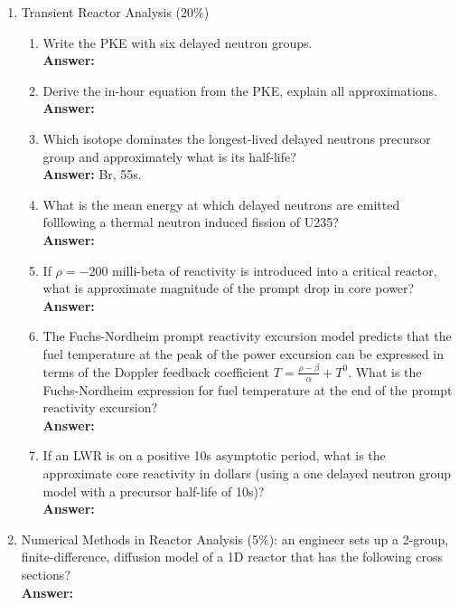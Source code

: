 \documentclass{school-22.211-notes}
\begin{document}
\begin{enumerate}
\item Transient Reactor Analysis (20\%) 
  \begin{enumerate}
  \item Write the PKE with six delayed neutron groups. \\
    \textbf{Answer:} 

  \item Derive the in-hour equation from the PKE, explain all approximations. \\
    \textbf{Answer:} 

  \item Which isotope dominates the longest-lived delayed neutrons precursor group and approximately what is its half-life? \\
    \textbf{Answer:} Br, 55s. 

  \item  What is the mean energy at which delayed neutrons are emitted folllowing a thermal neutron induced fission of U235? \\
    \textbf{Answer:} 

  \item If $\rho = -200$ milli-beta of reactivity is introduced into a critical reactor, what is approximate magnitude of the prompt drop in core power? \\
    \textbf{Answer:} 

  \item The Fuchs-Nordheim prompt reactivity excursion model predicts that the fuel temperature at the peak of the power excursion can be expressed in terms of the Doppler feedback coefficient $T = \frac{\rho - \beta}{\alpha} + T^0$. What is the Fuchs-Nordheim expression for fuel temperature at the end of the prompt reactivity excursion? \\
    \textbf{Answer:} 

  \item If an LWR is on a positive 10s asymptotic period, what is the approximate core reactivity in dollars (using a one delayed neutron group model with a precursor half-life of 10s)? \\
    \textbf{Answer:} 
  \end{enumerate}

\item Numerical Methods in Reactor Analysis (5\%): an engineer sets up a 2-group, finite-difference, diffusion model of a 1D reactor that has the following cross sections? \\
    \textbf{Answer:} 
\end{enumerate}
\end{document}
